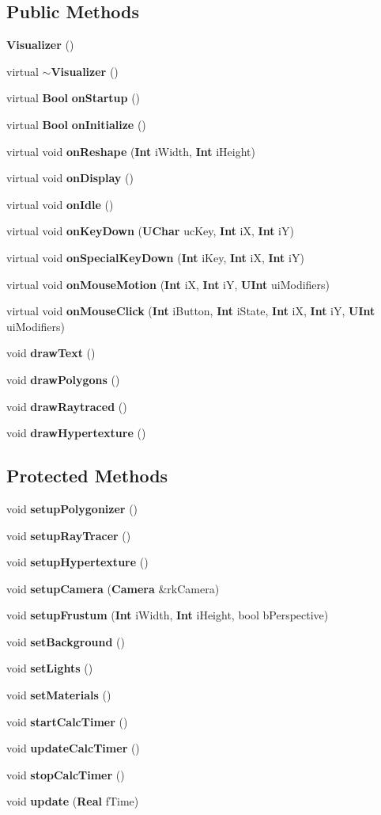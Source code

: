 \subsection*{Public Methods}
\begin{CompactItemize}
\item 
{\bf Visualizer} ()
\item 
virtual {\bf $\sim$Visualizer} ()
\item 
virtual {\bf Bool} {\bf on\-Startup} ()
\item 
virtual {\bf Bool} {\bf on\-Initialize} ()
\item 
virtual void {\bf on\-Reshape} ({\bf Int} i\-Width, {\bf Int} i\-Height)
\item 
virtual void {\bf on\-Display} ()
\item 
virtual void {\bf on\-Idle} ()
\item 
virtual void {\bf on\-Key\-Down} ({\bf UChar} uc\-Key, {\bf Int} i\-X, {\bf Int} i\-Y)
\item 
virtual void {\bf on\-Special\-Key\-Down} ({\bf Int} i\-Key, {\bf Int} i\-X, {\bf Int} i\-Y)
\item 
virtual void {\bf on\-Mouse\-Motion} ({\bf Int} i\-X, {\bf Int} i\-Y, {\bf UInt} ui\-Modifiers)
\item 
virtual void {\bf on\-Mouse\-Click} ({\bf Int} i\-Button, {\bf Int} i\-State, {\bf Int} i\-X, {\bf Int} i\-Y, {\bf UInt} ui\-Modifiers)
\item 
void {\bf draw\-Text} ()
\item 
void {\bf draw\-Polygons} ()
\item 
void {\bf draw\-Raytraced} ()
\item 
void {\bf draw\-Hypertexture} ()
\end{CompactItemize}
\subsection*{Protected Methods}
\begin{CompactItemize}
\item 
void {\bf setup\-Polygonizer} ()
\item 
void {\bf setup\-Ray\-Tracer} ()
\item 
void {\bf setup\-Hypertexture} ()
\item 
void {\bf setup\-Camera} ({\bf Camera} \&rk\-Camera)
\item 
void {\bf setup\-Frustum} ({\bf Int} i\-Width, {\bf Int} i\-Height, bool b\-Perspective)
\item 
void {\bf set\-Background} ()
\item 
void {\bf set\-Lights} ()
\item 
void {\bf set\-Materials} ()
\item 
void {\bf start\-Calc\-Timer} ()
\item 
void {\bf update\-Calc\-Timer} ()
\item 
void {\bf stop\-Calc\-Timer} ()
\item 
void {\bf update} ({\bf Real} f\-Time)
\end{CompactItemize}
